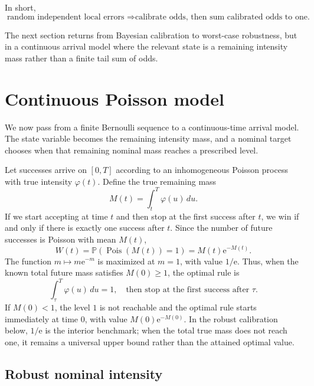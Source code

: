 \documentclass[11pt,a4paper]{article}
\DeclareMathOperator{\Pois}{Pois}
\newcommand{\e}{\mathrm e}
\begin{document}
In short,
\[
  \boxed{
  \text{random independent local errors }
  \Longrightarrow
  \text{calibrate odds, then sum calibrated odds to one.}
  }
\]

The next section returns from Bayesian calibration to worst-case robustness, but
in a continuous arrival model where the relevant state is a remaining intensity
mass rather than a finite tail sum of odds.

\section{Continuous Poisson model}
\label{sec:poisson}

We now pass from a finite Bernoulli sequence to a continuous-time arrival
model.  The state variable becomes the remaining intensity mass, and a nominal
target chooses when that remaining nominal mass reaches a prescribed level.

Let successes arrive on
\([0,T]\) according to an inhomogeneous Poisson process with true intensity
\(\varphi(t)\).  Define the true remaining mass
\[
  M(t)=\int_t^T\varphi(u)\,du.
\]
If we start accepting at time \(t\) and then stop at the first success after
\(t\), we win if and only if there is exactly one success after \(t\).  Since the
number of future successes is Poisson with mean \(M(t)\),
\[
  W(t)=\mathbb P(\Pois(M(t))=1)=M(t)\e^{-M(t)}.
\]
The function \(m\mapsto m\e^{-m}\) is maximized at \(m=1\), with value \(1/\e\).
Thus, when the known total future mass satisfies \(M(0)\ge1\), the optimal rule
is
\[
  \boxed{
  \int_\tau^T\varphi(u)\,du=1,
  \quad\text{then stop at the first success after }\tau.
  }
  \tag{8}
\]
If \(M(0)<1\), the level \(1\) is not reachable and the optimal rule starts
immediately at time \(0\), with value \(M(0)\e^{-M(0)}\).  In the robust
calibration below, \(1/\e\) is the interior benchmark; when the total true mass
does not reach one, it remains a universal upper bound rather than the attained
optimal value.

\subsection{Robust nominal intensity}
\end{document}
